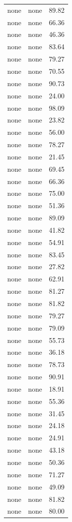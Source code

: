 \begin{tabular}{rrr}
none & none & 89.82 \\
none & none & 66.36 \\
none & none & 46.36 \\
none & none & 83.64 \\
none & none & 79.27 \\
none & none & 70.55 \\
none & none & 90.73 \\
none & none & 24.00 \\
none & none & 98.09 \\
none & none & 23.82 \\
none & none & 56.00 \\
none & none & 78.27 \\
none & none & 21.45 \\
none & none & 69.45 \\
none & none & 66.36 \\
none & none & 75.00 \\
none & none & 51.36 \\
none & none & 89.09 \\
none & none & 41.82 \\
none & none & 54.91 \\
none & none & 83.45 \\
none & none & 27.82 \\
none & none & 62.91 \\
none & none & 81.27 \\
none & none & 81.82 \\
none & none & 79.27 \\
none & none & 79.09 \\
none & none & 55.73 \\
none & none & 36.18 \\
none & none & 78.73 \\
none & none & 90.91 \\
none & none & 18.91 \\
none & none & 55.36 \\
none & none & 31.45 \\
none & none & 24.18 \\
none & none & 24.91 \\
none & none & 43.18 \\
none & none & 50.36 \\
none & none & 71.27 \\
none & none & 49.09 \\
none & none & 81.82 \\
none & none & 80.00 \\

\end{tabular}
